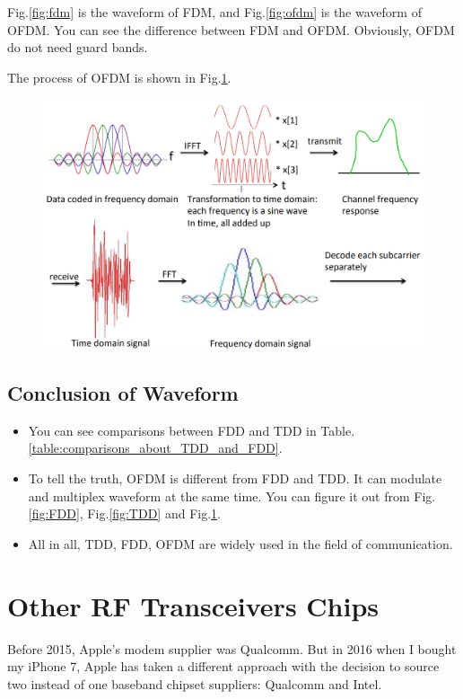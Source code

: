 \documentclass[conference]{IEEEtran}
\begin{document}
Fig.\ref{fig:fdm} is the waveform of FDM, and Fig.\ref{fig:ofdm} is the waveform of OFDM. You can see the difference between FDM and OFDM. Obviously, OFDM do not need guard bands.

The process of OFDM is shown in Fig.\ref{fig:processOfOFDM}.
\begin{figure}[!ht]
	\centering
	\begin{center}
		\includegraphics*[width=0.8\linewidth]{ProcessOFDM}
		\caption{}
		\label{fig:processOfOFDM}
	\end{center}
\end{figure}

\subsection{Conclusion of Waveform}
\begin{itemize}
	\item You can see comparisons between FDD and TDD in Table.\ref{table:comparisons_about_TDD_and_FDD}.
	\item To tell the truth, OFDM is different from FDD and TDD. It can modulate and multiplex waveform at the same time. You can figure it out from Fig.\ref{fig:FDD}, Fig.\ref{fig:TDD} and Fig.\ref*{fig:processOfOFDM}.
	\item All in all, TDD, FDD, OFDM are widely used in the field of communication.
\end{itemize}

\section{Other RF Transceivers Chips} \label{sec:orft}
Before 2015, Apple’s modem supplier was Qualcomm. But in 2016 when I bought my iPhone 7, Apple has taken a different approach with the decision to source two instead of one baseband chipset suppliers: Qualcomm and Intel.
\end{document}
